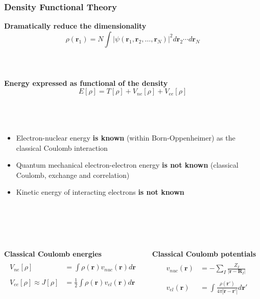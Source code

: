 \documentclass[mathserif, 8pt]{beamer}
\begin{document}
\begin{frame}
    \frametitle{Density Functional Theory}
    \centering
    \textbf{Dramatically reduce the dimensionality}
    \begin{equation}
	\nonumber
	\rho(\boldsymbol{r}_1) = N \int |\psi(\boldsymbol{r}_1, \boldsymbol{r}_2,\dots,
	\boldsymbol{r}_N)|^2 d\boldsymbol{r}_2\cdots d\boldsymbol{r}_N
    \end{equation}
    \ \\
    \ \\
    \ \\
    \textbf{Energy expressed as functional of the density}
    \begin{equation}
	\nonumber
	E[\rho] = T[\rho] + V_{ne}[\rho] + V_{ee}[\rho]
    \end{equation}
    \ \\
    \ \\
    \ \\
    \begin{itemize}
	\item	Electron-nuclear energy \textbf{is known} (within Born-Oppenheimer) as the classical Coulomb interaction
	\item	Quantum mechanical electron-electron energy \textbf{is not known} (classical Coulomb, exchange and correlation)
	\item	Kinetic energy of interacting electrons \textbf{is not known}
    \end{itemize}
    \ \\
    \ \\
    \ \\
    \begin{columns}
    \begin{column}{.50\textwidth}
    \centering
    \textbf{Classical Coulomb energies}
    \begin{align}
	\nonumber
	&\\
	\nonumber
	V_{ne}[\rho] &= \int \rho(\boldsymbol{r})v_{nuc}(\boldsymbol{r})d\boldsymbol{r}\\
	\nonumber
	&\\
	\nonumber
	V_{ee}[\rho] \approx J[\rho] &= \frac{1}{2} \int \rho(\boldsymbol{r})v_{el}(\boldsymbol{r})d\boldsymbol{r}
    \end{align}
    \end{column}
    \begin{column}{.50\textwidth}
    \centering
    \textbf{Classical Coulomb potentials}
    \begin{align}
	\nonumber
	&\\
	\nonumber
	v_{nuc}(\boldsymbol{r}) &= -\sum_I\frac{Z_I}{|\boldsymbol{r}-\boldsymbol{R}_I|}\\
	\nonumber
	&\\
	\nonumber
	v_{el}(\boldsymbol{r}) &= \int \frac{\rho(\boldsymbol{r}')}{4\pi|\boldsymbol{r}-\boldsymbol{r}'|} d\boldsymbol{r}'
    \end{align}
    \end{column}
    \end{columns}    
\end{frame}
\end{document}
